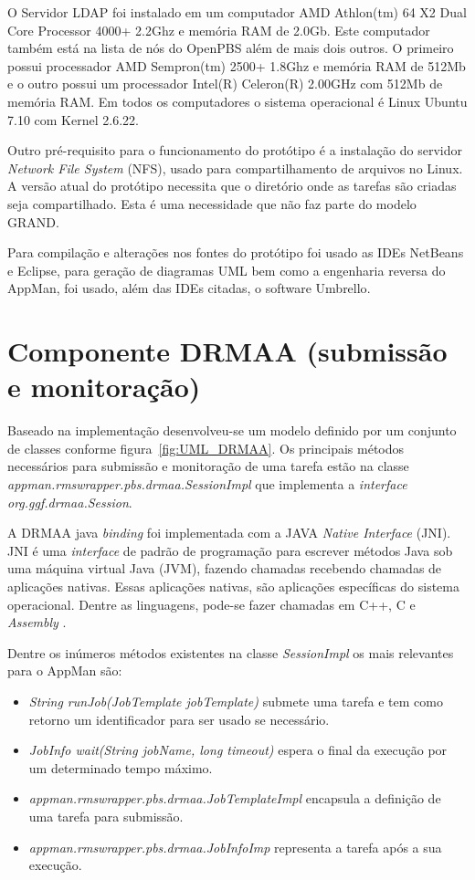 O Servidor LDAP foi instalado em um computador AMD Athlon(tm) 64 X2 Dual Core Processor 4000+ 2.2Ghz e memória RAM de 2.0Gb. Este computador também está na lista de nós do OpenPBS além de mais dois outros. O primeiro possui processador AMD Sempron(tm) 2500+ 1.8Ghz e memória RAM de 512Mb e o outro possui um processador Intel(R) Celeron(R) 2.00GHz com 512Mb de memória RAM. Em todos os computadores o sistema operacional é Linux Ubuntu 7.10 com Kernel 2.6.22.

Outro pré-requisito para o funcionamento do protótipo é a instalação do servidor \emph{Network File System} (NFS), usado para compartilhamento de arquivos no Linux. A versão atual do protótipo necessita que o diretório onde as tarefas são criadas seja compartilhado. Esta é uma necessidade que não faz parte do modelo GRAND.

Para compilação e alterações nos fontes do protótipo foi usado as IDEs NetBeans\cite{netbeans} e Eclipse\cite{eclipse}, para geração de diagramas UML bem como a engenharia reversa do AppMan, foi usado, além das IDEs citadas, o software Umbrello\cite{umbrello}.

\section{Componente DRMAA (submissão e monitoração)}

Baseado na implementação desenvolveu-se um modelo definido por um conjunto de classes conforme figura~\ref{fig:UML_DRMAA}. Os principais métodos necessários para submissão e monitoração de uma tarefa estão na classe \emph{appman.rmswrapper.pbs.drmaa.SessionImpl} que implementa a \emph{interface} \emph{org.ggf.drmaa.Session}.

A DRMAA java \emph{binding} foi implementada com a JAVA \emph{Native Interface} (JNI). JNI é uma \emph{interface} de padrão de programação para escrever métodos Java sob uma máquina virtual Java (JVM), fazendo chamadas recebendo chamadas de aplicações nativas. Essas aplicações nativas, são aplicações específicas do sistema operacional. Dentre as linguagens, pode-se fazer chamadas em C++, C e \emph{Assembly} \cite{jni}.

Dentre os inúmeros métodos existentes na classe \emph{SessionImpl} os mais relevantes para o AppMan são:

\begin{itemize}
	\item \emph{String runJob(JobTemplate jobTemplate)} submete uma tarefa e tem como retorno um identificador para ser usado se necessário.
	\item \emph{JobInfo wait(String jobName, long timeout)} espera o final da execução por um determinado tempo máximo.
	\item \emph{appman.rmswrapper.pbs.drmaa.JobTemplateImpl} encapsula a definição de uma tarefa para submissão.
	\item \emph{appman.rmswrapper.pbs.drmaa.JobInfoImp} representa a tarefa após a sua execução.
\end{itemize}


